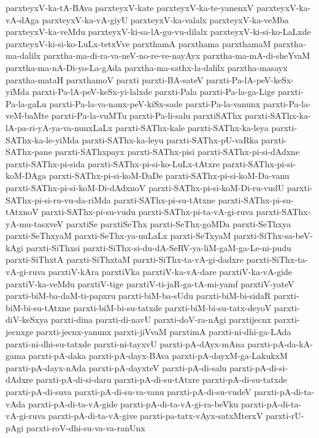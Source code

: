 {parxteyxV-ka-tA-BAva
parxteyxV-kate
parxteyxV-ka-te-yanenxV
parxteyxV-ka-vA-dAga
parxteyxV-ka-vA-giyU
parxteyxV-ka-valalx
parxteyxV-ka-veMba
parxteyxV-ka-veMdu
parxteyxV-ki-sa-lA-gu-vu-dilalx
parxteyxV-ki-si-ko-LaLxde
parxteyxV-ki-si-ko-LuLx-tetxVve
parxthamA
parxthama
parxthamaM
parxtha-ma-dalilx
parxtha-ma-di-ra-va-neV-no-re-ve-nayAyx
parxtha-ma-mA-di-sheYvaM
parxtha-ma-nA-Di-yo-La-gAda
parxtha-ma-sathx-la-dalilx
parxtha-masayx
parxtha-mataH
parxthamoV
parxti
parxti-BA-sateV
parxti-Pa-lA-peV-keSx-yiMda
parxti-Pa-lA-peV-keSx-yi-lalxde
parxti-Pala
parxti-Pa-la-ga-Lige
parxti-Pa-la-gaLu
parxti-Pa-la-va-nanx-peV-kiSx-sade
parxti-Pa-la-vanunx
parxti-Pa-la-veM-baMte
parxti-Pa-la-vuMTu
parxti-Pa-li-salu
parxtiSAThx
parxti-SAThx-ka-lA-pa-ri-yA-ya-va-nunxLaLx
parxti-SAThx-kale
parxti-SAThx-ka-leya
parxti-SAThx-ka-le-yiMda
parxti-SAThx-ka-leyu
parxti-SAThx-pU-vaRka
parxti-SAThx-pane
parxti-SAThxpayx
parxti-SAThx-pisi
parxti-SAThx-pi-si-dAdxne
parxti-SAThx-pi-sida
parxti-SAThx-pi-si-ko-LuLx-tAtxre
parxti-SAThx-pi-si-koM-DAga
parxti-SAThx-pi-si-koM-DaDe
parxti-SAThx-pi-si-koM-Da-vanu
parxti-SAThx-pi-si-koM-Di-dAdxnoV
parxti-SAThx-pi-si-koM-Di-ru-vudU
parxti-SAThx-pi-si-ru-vu-da-riMda
parxti-SAThx-pi-su-tAtxne
parxti-SAThx-pi-su-tAtxnoV
parxti-SAThx-pi-su-vudu
parxti-SAThx-pi-ta-vA-gi-ruva
parxti-SAThx-yA-mu-tasxveV
parxtiSe
parxtiSeThx
parxti-SeThx-goMDa
parxti-SeThxya
parxti-SeThxyaM
parxti-SeThx-ya-nuLaLx
parxti-SeTxyaM
parxti-SiThx-sa-beV-kAgi
parxti-SiThxsi
parxti-SiThx-si-du-dA-SeRV-ya-liM-gaM-ga-Le-ni-pudu
parxti-SiThxtA
parxti-SiThxtaM
parxti-SiThx-ta-vA-gi-dadxre
parxti-SiThx-ta-vA-gi-ruva
parxtiV-kAra
parxtiVka
parxtiV-ka-vA-dare
parxtiV-ka-vA-gide
parxtiV-ka-veMdu
parxtiV-tige
parxtiV-ti-jaR-ga-tA-mi-yamf
parxtiV-yateV
parxti-biM-ba-daM-ti-papxru
parxti-biM-ba-sUdu
parxti-biM-bi-sidaR
parxti-biM-bi-su-tAtxne
parxti-biM-bi-su-tatxde
parxti-biM-bi-su-tatx-deyoV
parxti-diV-keSxya
parxti-dina
parxti-di-navU
parxti-doV-ra-nAgi
parxtijecnx
parxti-jecnxge
parxti-jecnx-yanunx
parxti-jiVvaM
parxtimA
parxti-ni-dhi-ga-LAda
parxti-ni-dhi-su-tatxde
parxti-ni-tayxvU
parxti-pA-dAyx-mAna
parxti-pA-da-kA-gama
parxti-pA-daka
parxti-pA-dayx-BAva
parxti-pA-dayxM-ga-LakukxM
parxti-pA-dayx-nAda
parxti-pA-dayxteV
parxti-pA-di-salu
parxti-pA-di-si-dAdxre
parxti-pA-di-si-daru
parxti-pA-di-su-tAtxre
parxti-pA-di-su-tatxde
parxti-pA-di-suva
parxti-pA-di-su-va-vanu
parxti-pA-di-su-vudeV
parxti-pA-di-ta-vAda
parxti-pA-di-ta-vA-gide
parxti-pA-di-ta-vA-gi-ra-beVku
parxti-pA-di-ta-vA-gi-ruva
parxti-pA-di-ta-vA-give
parxti-pa-tatx-vAyx-satxMterxV
parxti-rU-pAgi
parxti-roV-dhi-su-va-va-ranUnx
}
